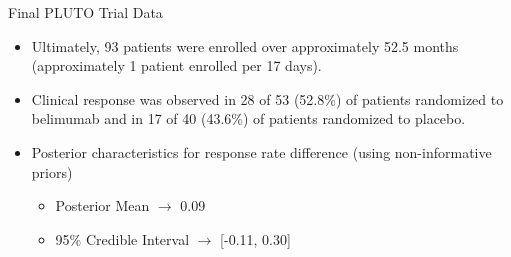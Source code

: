\documentclass{beamer}
\begin{document}

\begin{frame}{Final PLUTO Trial Data}
\begin{itemize}
\item Ultimately, 93 patients were enrolled over approximately 52.5 months (approximately 1 patient enrolled per 17 days).
%
\vspace{0.5cm}
\item Clinical response was observed in 28 of 53 (52.8\%) of patients randomized to belimumab and in 17 of 40 (43.6\%) of patients randomized to placebo.

\vspace{0.5cm}
\item Posterior characteristics for response rate difference (using non-informative priors)
\begin{itemize}
  \vspace{0.5cm}
	\item Posterior Mean $\rightarrow$ 0.09
	
	\vspace{0.5cm}
	\item 95\% Credible Interval $\rightarrow$ [-0.11, 0.30]
\end{itemize}
\end{itemize}
\end{frame}
\end{document}
